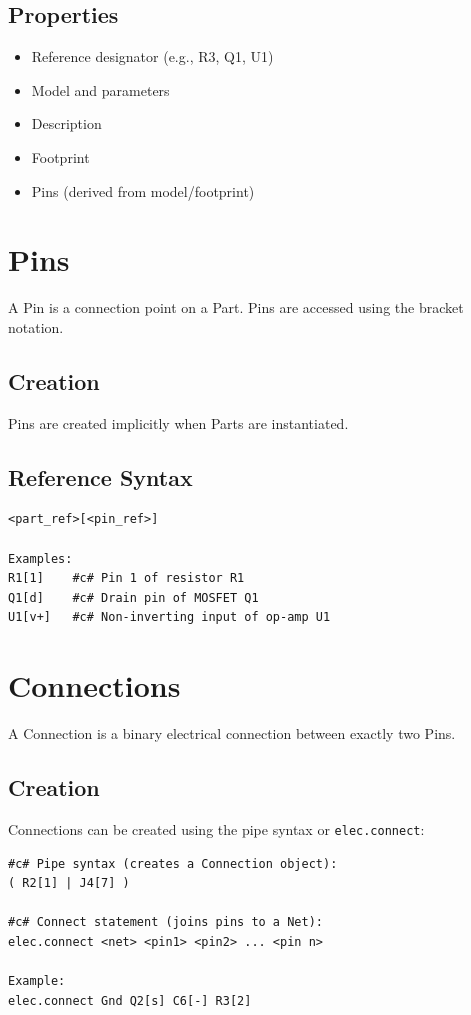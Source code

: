 \documentclass{report}
\begin{document}
\subsection{Properties}
\begin{itemize}
\item Reference designator (e.g., R3, Q1, U1)
\item Model and parameters
\item Description
\item Footprint
\item Pins (derived from model/footprint)
\end{itemize}

\section{Pins}
A Pin is a connection point on a Part. Pins are accessed using the bracket notation.

\subsection{Creation}
Pins are created implicitly when Parts are instantiated.

\subsection{Reference Syntax}
\begin{verbatim}
<part_ref>[<pin_ref>]

Examples:
R1[1]    #c# Pin 1 of resistor R1
Q1[d]    #c# Drain pin of MOSFET Q1
U1[v+]   #c# Non-inverting input of op-amp U1
\end{verbatim}

\section{Connections}
A Connection is a binary electrical connection between exactly two Pins.

\subsection{Creation}
Connections can be created using the pipe syntax or \texttt{elec.connect}:
\begin{verbatim}
#c# Pipe syntax (creates a Connection object):
( R2[1] | J4[7] )

#c# Connect statement (joins pins to a Net):
elec.connect <net> <pin1> <pin2> ... <pin n>

Example:
elec.connect Gnd Q2[s] C6[-] R3[2]
\end{verbatim}
\end{document}
